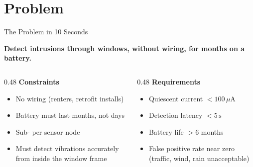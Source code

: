 \section{Problem}

\begin{frame}{The Problem in 10 Seconds}
\begin{center}
  \large\textbf{Detect intrusions through windows, without wiring, for months on a battery.}
\end{center}

\vspace{0.2cm}
\begin{columns}[T, onlytextwidth]
\begin{column}{0.48\textwidth}
  \textbf{Constraints}
  \begin{itemize}\setlength\itemsep{3pt}
    \item No wiring (renters, retrofit installs)
    \item Battery must last months, not days
    \item Sub- per sensor node
    \item Must detect vibrations accurately from inside the window frame
  \end{itemize}
\end{column}
\begin{column}{0.48\textwidth}
  \textbf{Requirements}
  \begin{itemize}\setlength\itemsep{3pt}
    \item Quiescent current $<100\,\mu$A
    \item Detection latency $<5\,\text{s}$
    \item Battery life $>6$ months
    \item False positive rate near zero (traffic, wind, rain unacceptable)
  \end{itemize}
\end{column}
\end{columns}
\end{frame}
